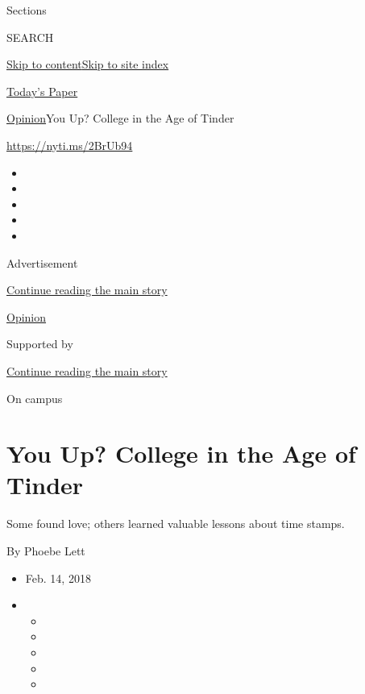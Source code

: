 Sections

SEARCH

\protect\hyperlink{site-content}{Skip to
content}\protect\hyperlink{site-index}{Skip to site index}

\href{https://myaccount.nytimes3xbfgragh.onion/auth/login?response_type=cookie\&client_id=vi}{}

\href{https://www.nytimes3xbfgragh.onion/section/todayspaper}{Today's
Paper}

\href{/section/opinion}{Opinion}\textbar{}You Up? College in the Age of
Tinder

\url{https://nyti.ms/2BrUb94}

\begin{itemize}
\item
\item
\item
\item
\item
\end{itemize}

Advertisement

\protect\hyperlink{after-top}{Continue reading the main story}

\href{/section/opinion}{Opinion}

Supported by

\protect\hyperlink{after-sponsor}{Continue reading the main story}

On campus

\hypertarget{you-up-college-in-the-age-of-tinder}{%
\section{You Up? College in the Age of
Tinder}\label{you-up-college-in-the-age-of-tinder}}

Some found love; others learned valuable lessons about time stamps.

By Phoebe Lett

\begin{itemize}
\item
  Feb. 14, 2018
\item
  \begin{itemize}
  \item
  \item
  \item
  \item
  \item
  \end{itemize}
\end{itemize}

